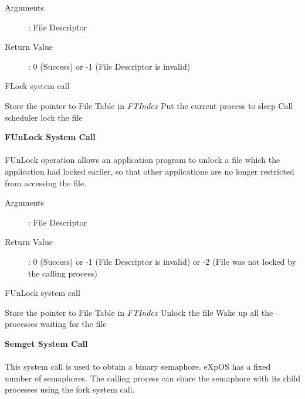 \documentclass[10pt]{article}
\begin{document}
\begin{description}
\item[Arguments]: File Descriptor
\item[Return Value]: 0 (Success) or -1 (File Descriptor is invalid)
\end{description} 
\begin{algorithm}
\caption{FLock system call}
\begin{algorithmic}
\ENDIF
{}
\ELSE 
    \STATE Store the pointer to File Table in \textit{FTIndex}
\ENDIF
{}
            \STATE Put the current process to sleep
            \STATE Call scheduler
        \ENDWHILE
    \ENDIF
\ENDIF
\STATE lock the file
\end{algorithmic}
\end{algorithm}
\textbf{FUnLock System Call}
\\ \\
FUnLock operation allows an application program to unlock a file which the application had locked earlier, so that other applications are no longer restricted from accessing the file.   
\begin{description}
\item[Arguments]: File Descriptor
\item[Return Value]: 0 (Success) or -1 (File Descriptor is invalid) or -2 (File was not locked by the calling process)
\end{description} 
\begin{algorithm}
\caption{FUnLock system call}
\begin{algorithmic}
\ENDIF
{}
\ELSE 
    \STATE Store the pointer to File Table in  \textit{FTIndex}
\ENDIF
{}
        \STATE Unlock the file
        \STATE Wake up all the processes waiting for the file
    \ELSE
    \ENDIF
\ENDIF
{}
\end{algorithmic}
\end{algorithm}
\vspace{33mm}
\textbf{Semget System Call}
\\ \\
This system call is used to obtain a binary semaphore. eXpOS has a fixed number of semaphores. The calling process can share the semaphore with its child processes using the fork system call. 
\end{document}
